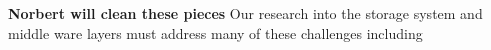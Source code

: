 {\bf {\color{red}Norbert will clean these pieces}}
Our research into the storage system and middle ware layers must address
many of these challenges including
